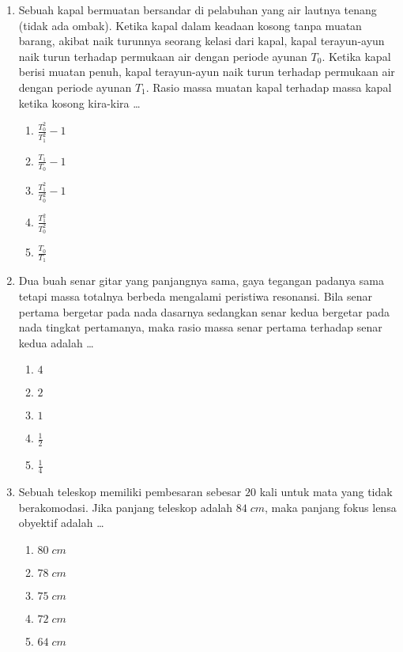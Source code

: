 \documentclass[A4,12PT, english, twocolumn]{journal}
\begin{document}
\begin{enumerate}
\item Sebuah kapal bermuatan bersandar di pelabuhan yang air lautnya tenang (tidak ada ombak). Ketika kapal dalam keadaan kosong tanpa muatan barang, akibat naik turunnya seorang kelasi dari kapal, kapal terayun-ayun naik turun terhadap permukaan air dengan periode ayunan $T_0$. Ketika kapal berisi muatan penuh, kapal terayun-ayun naik turun terhadap permukaan air dengan periode ayunan $T_1$. Rasio massa muatan kapal terhadap massa kapal ketika kosong kira-kira \dots
    \begin{enumerate}
        \item $\frac{T_0^2}{T_1^2}-1$
        \item $\frac{T_1}{T_0}-1$
        \item $\frac{T_1^2}{T_0^2}-1$
        \item $\frac{T_1^2}{T_0^2}$
        \item $\frac{T_0}{T_1}$
    \end{enumerate}
    
\item Dua buah senar gitar yang panjangnya sama, gaya tegangan padanya sama tetapi massa totalnya berbeda mengalami peristiwa resonansi. Bila senar pertama bergetar pada nada dasarnya sedangkan senar kedua bergetar pada nada tingkat pertamanya, maka rasio massa senar pertama terhadap senar kedua adalah \dots
	\begin{enumerate}
		\item $4$
		\item $2$
		\item $1$
		\item $\frac{1}{2}$
		\item $\frac{1}{4}$
	\end{enumerate}
	
\item Sebuah teleskop memiliki pembesaran sebesar $20$ kali untuk mata yang tidak berakomodasi. Jika panjang teleskop adalah $84 \; cm$, maka panjang fokus lensa obyektif adalah \dots
   \begin{enumerate}
        \item $80 \; cm$
        \item $78 \; cm$
        \item $75 \; cm$
        \item $72 \; cm$
        \item $64 \; cm$
   \end{enumerate}
   

\end{enumerate}
\end{document}
